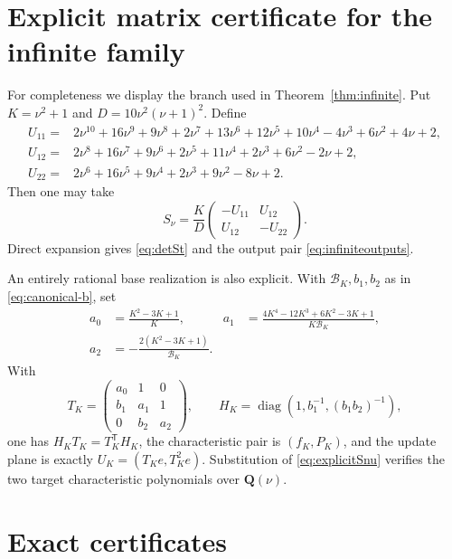 \documentclass[11pt,reqno]{amsart}
\theoremstyle{definition}
\theoremstyle{remark}
\newcommand{\Q}{\mathbf Q}
\begin{document}
\section{Explicit matrix certificate for the infinite family}
\label{app:explicit}

For completeness we display the branch used in
Theorem~\ref{thm:infinite}.  Put $K=\nu^2+1$ and
$D=10\nu^2(\nu+1)^2$.  Define
\begin{align*}
 U_{11}={}&2\nu^{10}+16\nu^9+9\nu^8+2\nu^7+13\nu^6+12\nu^5
 +10\nu^4-4\nu^3+6\nu^2+4\nu+2,\\
 U_{12}={}&2\nu^8+16\nu^7+9\nu^6+2\nu^5+11\nu^4+2\nu^3
 +6\nu^2-2\nu+2,\\
 U_{22}={}&2\nu^6+16\nu^5+9\nu^4+2\nu^3+9\nu^2-8\nu+2.
\end{align*}
Then one may take
\begin{equation}\label{eq:explicitSnu}
 S_\nu=\frac K D
 \begin{pmatrix}-U_{11}&U_{12}\\U_{12}&-U_{22}\end{pmatrix}.
\end{equation}
Direct expansion gives \eqref{eq:detSt} and the output pair
\eqref{eq:infiniteoutputs}.

An entirely rational base realization is also explicit.  With
$\mathcal B_K,b_1,b_2$ as in \eqref{eq:canonical-b}, set
\begin{align*}
 a_0&=\frac{K^2-3K+1}{K},&
 a_1&=\frac{4K^4-12K^3+6K^2-3K+1}{K\mathcal B_K},\\
 a_2&=-\frac{2(K^2-3K+1)}{\mathcal B_K}.&&
\end{align*}
With
\[
 T_K=\begin{pmatrix}a_0&1&0\\b_1&a_1&1\\0&b_2&a_2\end{pmatrix},
 \qquad H_K=\operatorname{diag}\left(1,b_1^{-1},(b_1b_2)^{-1}\right),
\]
one has $H_KT_K=T_K^{\mathsf T}H_K$, the characteristic pair is
$(f_K,P_K)$, and the update plane is exactly
$U_K=(T_Ke,T_K^2e)$.  Substitution of \eqref{eq:explicitSnu} verifies the
two target characteristic polynomials over $\Q(\nu)$.

\section{Exact certificates}
\end{document}

